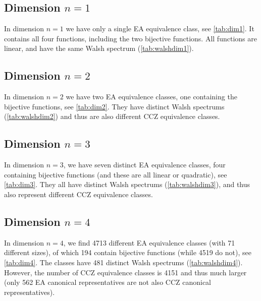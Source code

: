 \subsection{Dimension $n=1$}
In dimension $n=1$ we have only a single EA equivalence class, see \autoref{tab:dim1}.  It contains all four functions, including the two bijective functions. All functions are linear, and have the same Walsh spectrum (\autoref{tab:walshdim1}).

\subsection{Dimension $n=2$}
In dimension $n=2$ we have two EA equivalence classes, one containing the bijective functions, see \autoref{tab:dim2}. They have distinct Walsh spectrums (\autoref{tab:walshdim2}) and thus are also different CCZ equivalence classes.

\subsection{Dimension $n=3$}
In dimension $n=3$, we have seven distinct EA equivalence classes, four containing bijective functions (and these are all linear or quadratic), see \autoref{tab:dim3}.  They all have distinct Walsh spectrums (\autoref{tab:walshdim3}), and thus also represent different CCZ equivalence classes.

\subsection{Dimension $n=4$}
In dimension $n=4$, we find 4713 different EA equivalence classes (with 71 different sizes), of which 194 contain bijective functions (while 4519 do not), see \autoref{tab:dim4}. The classes have 481 distinct Walsh spectrums (\autoref{tab:walshdim4}). However, the number of CCZ equivalence classes is 4151 and thus much larger (only 562 EA canonical representatives are not also CCZ canonical representatives).
